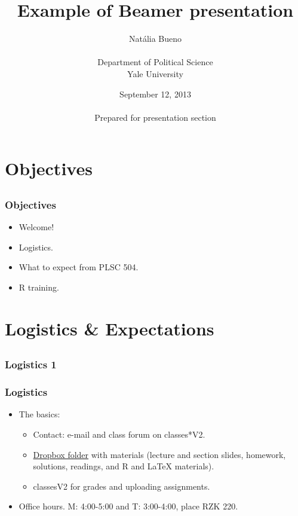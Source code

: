 \documentclass{beamer}
\title[PLSC 504: Advanced Quantitative Methods\hspace{2em}\insertframenumber/
\inserttotalframenumber] {Example of Beamer presentation}
\author[Nat\'{a}lia Bueno]{Nat\'{a}lia Bueno\\~\\Department of Political Science\\Yale University}
\date{September 12, 2013\\~\\Prepared for presentation section}
\begin{document}

\frame{\titlepage} %

\section{Objectives}

\subsection{} %
\frame %
{ %
\frametitle{Objectives} %
\begin{itemize}
\item Welcome!
\item Logistics.
\item What to expect from PLSC 504.
\item R training.
\end{itemize}
} %

\section{Logistics \& Expectations}

\subsection[Logistics 1]{}
\subsubsection{Logistics 1}
\frame
{
\frametitle[Logistics 1]{Logistics}
\begin{itemize}
\pause \item The basics: %
\begin{itemize}
\item Contact: e-mail and class forum on classes*V2.
\item \href{https://www.dropbox.com/sh/8gos1knztfhdgty/IzxBeqKvUW}{Dropbox folder} with materials (lecture and section slides, homework, solutions, readings, and R and \LaTeX{} materials).
\item classesV2 for grades and uploading assignments.
\end{itemize}
\pause \item Office hours. M: 4:00-5:00 and T: 3:00-4:00, place RZK 220.   
\end{itemize}
}
\end{document}
